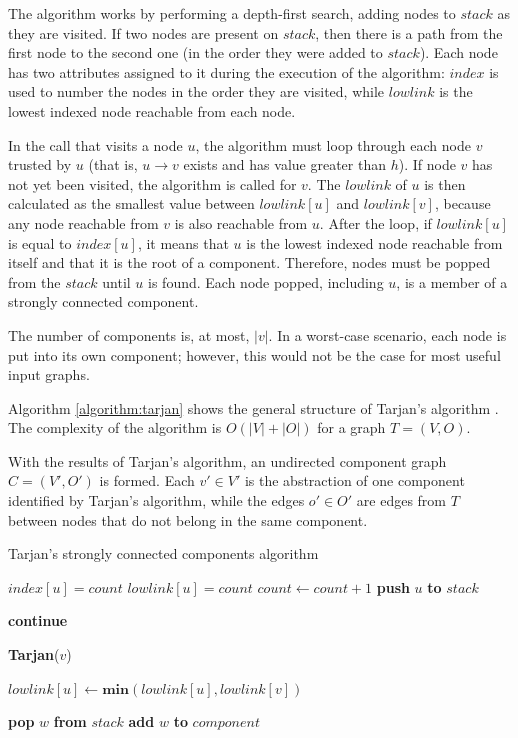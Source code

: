 \documentclass[conference]{IEEEtran}
\begin{document}
The algorithm works by performing a depth-first search, adding nodes to $stack$ as they are visited.
If two nodes are present on $stack$, then there is a path from the first node to the second one (in the order they were added to $stack$).
Each node has two attributes assigned to it during the execution of the algorithm: $index$ is used to number the nodes in the order they are visited, while $lowlink$ is the lowest indexed node reachable from each node.

In the call that visits a node $u$, the algorithm must loop through each node $v$ trusted by $u$ (that is, $u \rightarrow v$ exists and has value greater than $h$).
If node $v$ has not yet been visited, the algorithm is called for  $v$.
The $lowlink$ of $u$ is then calculated as the smallest value between $lowlink[u]$ and $lowlink[v]$, because any node reachable from $v$ is also reachable from $u$.
After the loop, if $lowlink[u]$ is equal to $index[u]$, it means that $u$ is the lowest indexed node reachable from itself and that it is the root of a component.
Therefore, nodes must be popped from the $stack$ until $u$ is found.
Each node popped, including $u$, is a member of a strongly connected component.

The number of components is, at most, $|v|$.
In a worst-case scenario, each node is put into its own component; however, this would not be the case for most useful input graphs.

Algorithm \autoref{algorithm:tarjan} shows the general structure of Tarjan's algorithm  \cite{tarjan1972depth}.
The complexity of the algorithm is $O(|V|+|O|)$ for a graph $T = (V,O)$.

With the results of Tarjan's algorithm, an undirected component graph $C = (V',O')$ is formed.
Each $v' \in V'$ is the abstraction of one component identified by Tarjan's algorithm, while the edges $o' \in O'$ are edges from $T$ between nodes that do not belong in the same component.

\begin{algorithm}
\caption{Tarjan's strongly connected components algorithm}\label{algorithm:tarjan}
\begin{algorithmic}[1]


\State $index[u] = count$
\State $lowlink[u] = count$
\State $count \gets count + 1$
\State \textbf{push} $u$ \textbf{to} $stack$

		\State \textbf{continue}
	\EndIf	
		
		\State \textbf{Tarjan}($v$)
	\EndIf
	
	\State $lowlink[u] \gets \textbf{min}(lowlink[u],lowlink[v])$
\EndFor

	\Repeat
		\State \textbf{pop} $w$ \textbf{from} $stack$
		\State \textbf{add} $w$ \textbf{to} $component$
\EndIf

\EndFunction
\end{algorithmic}
\end{algorithm}
\end{document}
